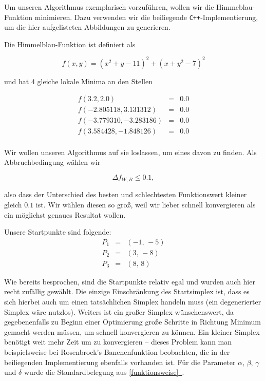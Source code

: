 \documentclass[naustrian]{article}
\newcommand*{\fullref}[1]{\hyperref[{#1}]{\autoref*{#1}~\nameref*{#1}}}
\begin{document}
{Um unseren Algorithmus exemplarisch vorzuführen, wollen wir die Himmeblau-
Funktion minimieren. Dazu verwenden wir die beiliegende {\tt C++}-Implementierung, um
die hier aufgelisteten Abbildungen zu generieren.

Die Himmelblau-Funktion ist definiert als

\[
    f(x,y) = (x^2 + y - 11)^2 + (x + y^2 - 7)^2
\]

und hat 4 gleiche lokale Minima an den Stellen

\begin{eqnarray*}
    f(3.2, 2.0) & = & 0.0\\
    f(-2.805118, 3.131312) & = & 0.0\\
    f(-3.779310, -3.283186) & = & 0.0\\
    f(3.584428, -1.848126) & = & 0.0\\
\end{eqnarray*}

Wir wollen unseren Algorithmus auf sie loslassen, um eines davon zu finden. Als
Abbruchbedingung wählen wir

\[
    \Delta f_{W,B} \leq 0.1,
\]

also dass der Unterschied des besten und schlechtesten Funktionswert kleiner
gleich $0.1$ ist. Wir wählen diesen so groß, weil wir lieber schnell
konvergieren als ein möglichst genaues Resultat wollen.

Unsere Startpunkte sind folgende:
\begin{eqnarray*}
    P_{1} & = & (-1,\,-5)\\
    P_{2} & = & (3,\,-8)\\
    P_{3} & = & (8,\,8)
\end{eqnarray*}

Wie bereits besprochen, sind die Startpunkte relativ egal und wurden auch hier
recht zufällig gewählt. Die einzige Einschränkung des Startsimplex ist, dass es
sich hierbei auch um einen tatsächlichen Simplex handeln muss (ein
degenerierter Simplex wäre nutzlos). Weiters ist ein großer Simplex
wünschenswert, da gegebenenfalls zu Beginn einer Optimierung große Schritte in
Richtung Minimum gemacht werden müssen, um schnell konvergieren zu können. Ein
kleiner Simplex benötigt weit mehr Zeit um zu konvergieren -- dieses Problem
kann man beispielsweise bei Rosenbrock's Banenenfunktion beobachten, die in der
beiliegenden Implementierung ebenfalls vorhanden ist. Für die Parameter $\alpha$,
$\beta$, $\gamma$ und $\delta$ wurde die Standardbelegung aus \fullref{funktionsweise}.

}
\end{document}
